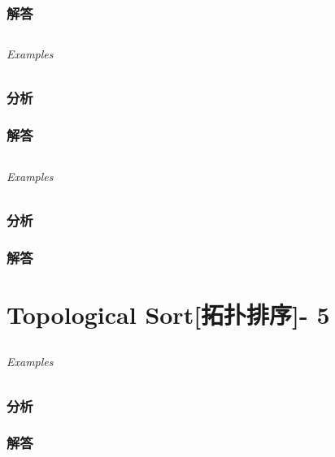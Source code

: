 \documentclass[UTF8,a4paper,12pt]{ctexbook}
\begin{document}
	\subsection{解答}
	
\section{}
	
	\subparagraph{Examples}
	
	\subsection{分析}
	
	\subsection{解答}
	
\section{}
	
	\subparagraph{Examples}
	
	\subsection{分析}
	
	\subsection{解答}
\chapter{Topological Sort[拓扑排序]- 5}
\section{}
	
	\subparagraph{Examples}
	
	\subsection{分析}
	
	\subsection{解答}
	
\section{}
	
\end{document}
